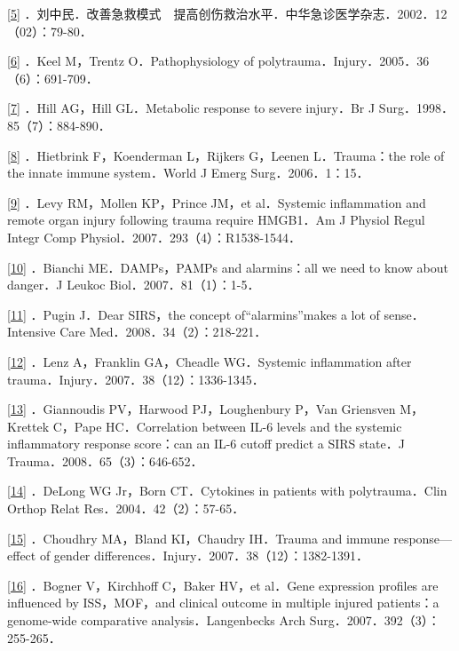 \protect\hyperlink{text00024.htmlux5cux23ch5-23-back}{{[}5{]}}
．刘中民．改善急救模式　提高创伤救治水平．中华急诊医学杂志．2002．12（02）：79-80．

\protect\hyperlink{text00024.htmlux5cux23ch6-23-back}{{[}6{]}} ．Keel
M，Trentz O．Pathophysiology of
polytrauma．Injury．2005．36（6）：691-709．

\protect\hyperlink{text00024.htmlux5cux23ch7-23-back}{{[}7{]}} ．Hill
AG，Hill GL．Metabolic response to severe injury．Br J
Surg．1998．85（7）：884-890．

\protect\hyperlink{text00024.htmlux5cux23ch8-23-back}{{[}8{]}}
．Hietbrink F，Koenderman L，Rijkers G，Leenen L．Trauma：the role of
the innate immune system．World J Emerg Surg．2006．1：15．

\protect\hyperlink{text00024.htmlux5cux23ch9-23-back}{{[}9{]}} ．Levy
RM，Mollen KP，Prince JM，et al．Systemic inflammation and remote organ
injury following trauma require HMGB1．Am J Physiol Regul Integr Comp
Physiol．2007．293（4）：R1538-1544．

\protect\hyperlink{text00024.htmlux5cux23ch10-23-back}{{[}10{]}}
．Bianchi ME．DAMPs，PAMPs and alarmins：all we need to know about
danger．J Leukoc Biol．2007．81（1）：1-5．

\protect\hyperlink{text00024.htmlux5cux23ch11-23-back}{{[}11{]}} ．Pugin
J．Dear SIRS，the concept of“alarmins”makes a lot of sense．Intensive
Care Med．2008．34（2）：218-221．

\protect\hyperlink{text00024.htmlux5cux23ch12-23-back}{{[}12{]}} ．Lenz
A，Franklin GA，Cheadle WG．Systemic inflammation after
trauma．Injury．2007．38（12）：1336-1345．

\protect\hyperlink{text00024.htmlux5cux23ch13-23-back}{{[}13{]}}
．Giannoudis PV，Harwood PJ，Loughenbury P，Van Griensven M，Krettek
C，Pape HC．Correlation between IL-6 levels and the systemic
inflammatory response score：can an IL-6 cutoff predict a SIRS state．J
Trauma．2008．65（3）：646-652．

\protect\hyperlink{text00024.htmlux5cux23ch14-23-back}{{[}14{]}}
．DeLong WG Jr，Born CT．Cytokines in patients with polytrauma．Clin
Orthop Relat Res．2004．42（2）：57-65．

\protect\hyperlink{text00024.htmlux5cux23ch15-23-back}{{[}15{]}}
．Choudhry MA，Bland KI，Chaudry IH．Trauma and immune response---
effect of gender differences．Injury．2007．38（12）：1382-1391．

\protect\hyperlink{text00024.htmlux5cux23ch16-23-back}{{[}16{]}}
．Bogner V，Kirchhoff C，Baker HV，et al．Gene expression profiles are
influenced by ISS，MOF，and clinical outcome in multiple injured
patients：a genome-wide comparative analysis．Langenbecks Arch
Surg．2007．392（3）：255-265．

